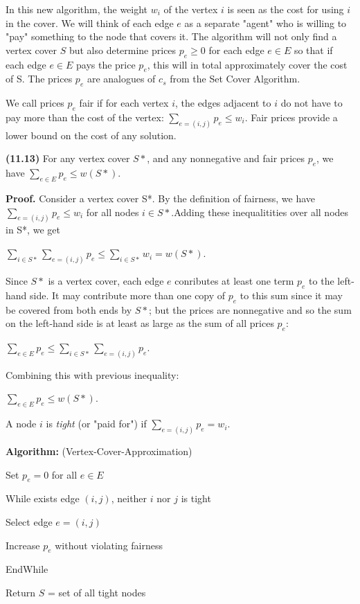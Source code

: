\documentclass{proc}
\begin{document}
In this new algorithm, the weight $w_i$ of the vertex $i$ is seen as the cost for using $i$ in the cover. We will think of each edge $e$ as a separate "agent" who is willing to "pay" something to the node that covers it. The algorithm will not only find a vertex cover $S$ but also determine prices $p_e \ge 0$ for each edge $e \in E$ so that if each edge $e \in E$ pays the price $p_e$, this will in total approximately cover the cost of S. The prices $p_e$ are analogues of $c_s$ from the Set Cover Algorithm.

We call prices $p_e$ fair if for each vertex $i$, the edges adjacent to $i$ do not have to pay more than the cost of the vertex: $\sum_{e=(i,j)} p_e \le w_i$. Fair prices provide a lower bound on the cost of any solution.

\begin{mdframed}
    \textbf{(11.13)} For any vertex cover $S*$, and any nonnegative and fair prices $p_e$, we have $\sum_{e \in E} p_e \le w(S*)$.
    
    \textbf{Proof.} Consider a vertex cover S*. By the definition of fairness, we have $\sum_{e=(i,j)} p_e \le w_i$ for all nodes $i \in S*$.Adding these inequalitities over all nodes in S*, we get
    
    $\sum_{i \in S*} \sum_{e=(i,j)} p_e \le \sum_{i \in S*} w_i = w(S*)$.
    
    Since $S*$ is a vertex cover, each edge $e$ conributes at least one term $p_e$ to the left-hand side. It may contribute more than one copy of $p_e$ to this sum since it may be covered from both ends by $S*$; but the prices are nonnegative and so the sum on the left-hand side is at least as large as the sum of all prices $p_e$:

    $\sum_{e \in E} p_e \le \sum_{i \in S*} \sum_{e=(i,j)} p_e$.
    
    \noindent Combining this with previous inequality:
    
    $\sum_{e \in E} p_e \le w(S*)$.
\end{mdframed}

A node $i$ is \textit{tight} (or "paid for") if $\sum_{e=(i,j)} p_e = w_i$.

\begin{mdframed}
    \textbf{Algorithm:} (Vertex-Cover-Approximation)
    
    Set $p_e = 0$ for all $e \in E$
    
    While exists edge $(i,j)$, neither $i$ nor $j$ is tight

    \hspace{2ex} Select edge $e = (i,j)$

    \hspace{2ex} Increase $p_e$ without violating fairness
    
    EndWhile
    
    Return $S$ = set of all tight nodes
\end{mdframed}
\end{document}
